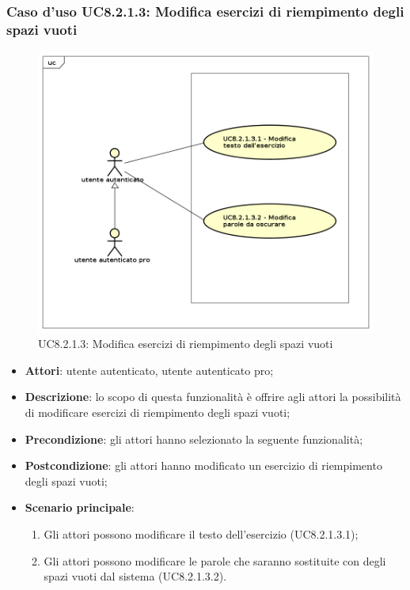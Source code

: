 \subsubsection{Caso d'uso UC8.2.1.3: Modifica esercizi di riempimento degli spazi vuoti}
	\label{UC8.2.1.3}
	\begin{figure}[h]
		\centering
			\includegraphics[scale=0.45,keepaspectratio]{UML/UC8_2_1_3.png}
		\caption{UC8.2.1.3: Modifica esercizi di riempimento degli spazi vuoti}
	\end{figure}
	\FloatBarrier
	\begin{itemize}
		\item
			\textbf{Attori}: utente autenticato, utente autenticato pro;
		\item		
			\textbf{Descrizione}: lo scopo di questa funzionalità è offrire agli attori la possibilità di modificare esercizi di riempimento degli spazi vuoti;
		\item
			\textbf{Precondizione}: gli attori hanno selezionato la seguente funzionalità; 
		\item
			\textbf{Postcondizione}: gli attori hanno modificato un esercizio di riempimento degli spazi vuoti;
		\item
			\textbf{Scenario principale}:
	       		\begin{enumerate}
	       			\item
	       			Gli attori possono modificare il testo dell'esercizio (UC8.2.1.3.1);
	       			\item
	       			Gli attori possono modificare le parole che saranno sostituite con degli spazi vuoti dal sistema (UC8.2.1.3.2).
	 			\end{enumerate}
	\end{itemize}
	
